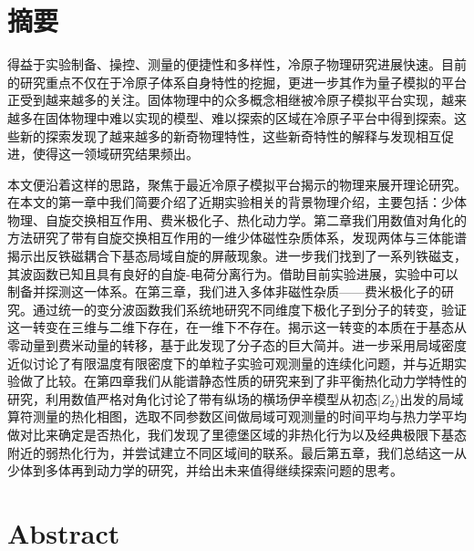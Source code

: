 \maketitle%
\MAKETITLE%
\makedeclaration%
\intobmk\chapter*{摘\quad 要}%
\setcounter{page}{1}%

得益于实验制备、操控、测量的便捷性和多样性，冷原子物理研究进展快速。目前的研究重点不仅在于冷原子体系自身特性的挖掘，更进一步其作为量子模拟的平台正受到越来越多的关注。固体物理中的众多概念相继被冷原子模拟平台实现，越来越多在固体物理中难以实现的模型、难以探索的区域在冷原子平台中得到探索。这些新的探索发现了越来越多的新奇物理特性，这些新奇特性的解释与发现相互促进，使得这一领域研究结果频出。

本文便沿着这样的思路，聚焦于最近冷原子模拟平台揭示的物理来展开理论研究。在本文的第一章中我们简要介绍了近期实验相关的背景物理介绍，主要包括：少体物理、自旋交换相互作用、费米极化子、热化动力学。第二章我们用数值对角化的方法研究了带有自旋交换相互作用的一维少体磁性杂质体系，发现两体与三体能谱揭示出反铁磁耦合下基态局域自旋的屏蔽现象。进一步我们找到了一系列铁磁支，其波函数已知且具有良好的自旋-电荷分离行为。借助目前实验进展，实验中可以制备并探测这一体系。在第三章，我们进入多体非磁性杂质——费米极化子的研究。通过统一的变分波函数我们系统地研究不同维度下极化子到分子的转变，验证这一转变在三维与二维下存在，在一维下不存在。揭示这一转变的本质在于基态从零动量到费米动量的转移，基于此发现了分子态的巨大简并。进一步采用局域密度近似讨论了有限温度有限密度下的单粒子实验可观测量的连续化问题，并与近期实验做了比较。在第四章我们从能谱静态性质的研究来到了非平衡热化动力学特性的研究，利用数值严格对角化讨论了带有纵场的横场伊辛模型从初态$|Z_2\rangle$出发的局域算符测量的热化相图，选取不同参数区间做局域可观测量的时间平均与热力学平均做对比来确定是否热化，我们发现了里德堡区域的非热化行为以及经典极限下基态附近的弱热化行为，并尝试建立不同区域间的联系。最后第五章，我们总结这一从少体到多体再到动力学的研究，并给出未来值得继续探索问题的思考。



\intobmk\chapter*{Abstract}%

